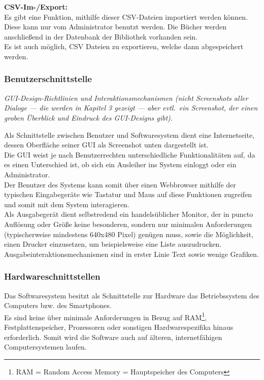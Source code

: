 \documentclass[fontsize=12pt,paper=a4,twoside]{scrartcl}
\begin{document}
  \textbf{CSV-Im-/Export:}\\
  Es gibt eine Funktion, mithilfe dieser CSV-Dateien importiert werden können. Diese kann nur vom Administrator benutzt werden. Die Bücher werden anschließend in der Datenbank der Bibliothek vorhanden sein. \\
  Es ist auch möglich, CSV Dateien zu exportieren, welche dann abgespeichert werden.

\subsubsection{Benutzerschnittstelle}

  {\em GUI-Design-Richtlinien und Interaktionsmechanismen (nicht
  Screenshots aller Dialoge --- die werden in Kapitel 3 gezeigt --- aber
  evtl.\ ein Screenshot, der einen groben Überblick und Eindruck des
  GUI-Designs gibt).}

Als Schnittstelle zwischen Benutzer und Softwaresystem dient eine Internetseite, dessen Oberfläche seiner GUI als Screenshot unten dargestellt ist. \\
Die GUI weist je nach Benutzerrechten unterschiedliche Funktionalitäten auf, da es einen Unterschied ist, ob sich ein Ausleiher ins System einloggt oder ein Administrator. \\
Der Benutzer des Systems kann somit über einen Webbrowser mithilfe der typischen Eingabegeräte wie Tastatur und Maus auf diese Funktionen zugreifen und somit mit dem System interagieren. \\
Als Ausgabegerät dient selbstredend ein handelsüblicher Monitor, der in puncto Auflösung oder Größe keine besonderen, sondern nur minimalen Anforderungen (typischerweise mindestens 640x480 Pixel) genügen muss, sowie die Möglichkeit, einen Drucker einzusetzen, um beispielsweise eine Liste auszudrucken. \\
Ausgabeinteraktionsmechanismen sind in erster Linie Text sowie wenige Grafiken. 

\subsubsection{Hardwareschnittstellen} \label{hardware}
Das Softwaresystem besitzt als Schnittstelle zur Hardware das Betriebssystem des Computers bzw. des Smartphones. \\
  Es sind keine über minimale Anforderungen in Bezug auf RAM\footnote{RAM = Random Access Memory = Hauptspeicher des Computers}, Festplattenspeicher, Prozessoren oder sonstigen Hardwarespezifika hinaus erforderlich. Somit wird die Software auch auf älteren, internetfähigen Computersystemen laufen. \\
 
\end{document}
